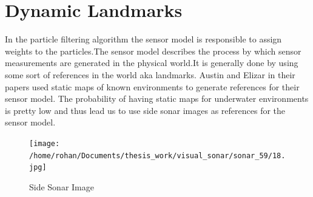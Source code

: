 \documentclass[12pt]{dalcsthesis}
\begin{document}
\section{Dynamic Landmarks}
In the particle filtering algorithm the sensor model is responsible to assign weights to the particles.The sensor model describes the process by which sensor measurements are generated in the physical world.It is generally done by using some sort of references in the world aka landmarks. Austin and Elizar in their papers used static maps of known environments to generate references for their sensor model.
The probability of having static maps for underwater environments is pretty low and thus lead us to use side sonar images as references for the sensor model.
\begin{figure}[hbtp]
\caption{Side Sonar Image}
\centering
\texttt{[image: /home/rohan/Documents/thesis\_work/visual\_sonar/sonar\_59/18.jpg]}
\end{figure}
\end{document}
